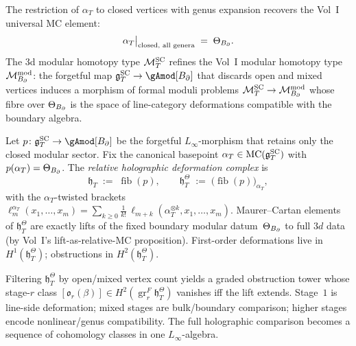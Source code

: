 \begin{corollary}
The restriction of $\alpha_T$ to closed vertices with
genus expansion recovers the Vol~I universal MC element:
\[
\alpha_T\big|_{\text{closed, all genera}}
\;=\;
\Theta_{B_{\partial}}.
\]
The 3d modular homotopy type $\mathcal M^{\mathrm{SC}}_T$ refines the
Vol~I modular homotopy type $\mathcal M^{\mathrm{mod}}_{B_{\partial}}$:
the forgetful map $\gSC_T \to \gAmod[\Bbound]$ that discards
open and mixed vertices induces a morphism of formal moduli
problems $\mathcal M^{\mathrm{SC}}_T \to \mathcal M^{\mathrm{mod}}_{B_{\partial}}$
whose fibre over $\Theta_{B_{\partial}}$ is the space of line-category
deformations compatible with the boundary algebra.
\end{corollary}

\begin{definition}%
%
%
Let $p\colon \gSC_T \to \gAmod[\Bbound]$ be the
forgetful $L_\infty$-morphism that retains only the closed
modular sector. Fix the canonical basepoint
$\alpha_T \in \operatorname{MC}(\mathfrak{g}^{\mathrm{SC}}_T)$ with
$p(\alpha_T) = \Theta_{B_{\partial}}$. The \emph{relative
holographic deformation complex} is
\[
\mathfrak{h}_T
\;:=\;
\operatorname{fib}(p),
\qquad
\mathfrak{h}_T^\Theta
\;:=\;
\bigl(\operatorname{fib}(p)\bigr)_{\alpha_T},
\]
with the $\alpha_T$-twisted brackets
$\ell_m^{\alpha_T}(x_1,\ldots,x_m)
= \sum_{k \geq 0}\frac{1}{k!}\,
\ell_{m+k}(\alpha_T^{\otimes k},x_1,\ldots,x_m)$.
Maurer--Cartan elements of $\mathfrak{h}_T^\Theta$
are exactly lifts of the fixed boundary modular
datum~$\Theta_{B_{\partial}}$ to full $3d$ data
(by Vol~I's lift-as-relative-MC proposition).
First-order deformations live in
$H^1(\mathfrak{h}_T^\Theta)$; obstructions in
$H^2(\mathfrak{h}_T^\Theta)$.
\end{definition}

\begin{remark}%
%
Filtering $\mathfrak{h}_T^\Theta$ by open/mixed vertex
count yields a graded obstruction tower whose stage-$r$
class $[\mathfrak{o}_r(\beta)]
\in H^2(\operatorname{gr}^F_r \mathfrak{h}_T^\Theta)$
vanishes iff the lift extends. Stage~$1$ is line-side
deformation; mixed stages are bulk/boundary comparison;
higher stages encode nonlinear/genus compatibility.
The full holographic comparison becomes a sequence of
cohomology classes in one
$L_\infty$-algebra.
\end{remark}

